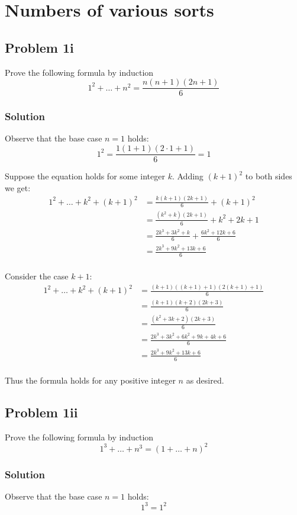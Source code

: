 \section{Numbers of various sorts}
\subsection*{Problem 1i}
Prove the following formula by induction
\[1^2+\ldots+n^2=\frac{n(n+1)(2n+1)}{6}\]

\subsubsection*{Solution}
Observe that the base case $n=1$ holds:
\[1^2=\frac{1(1+1)(2\cdot1+1)}{6}=1\]

Suppose the equation holds for some integer $k$. Adding $(k+1)^2$ to both sides we get:
\begin{align*}
    1^2+\ldots+k^2+(k+1)^2&=\frac{k(k+1)(2k+1)}{6}+(k+1)^2\\
    &=\frac{(k^2+k)(2k+1)}{6}+k^2+2k+1\\
    &=\frac{2k^3+3k^2+k}{6}+\frac{6k^2+12k+6}{6}\\
    &=\frac{2k^3+9k^2+13k+6}{6}\\
\end{align*}

Consider the case $k+1$:
\begin{align*}
    1^2+\ldots+k^2+(k+1)^2&=\frac{(k+1)((k+1)+1)(2(k+1)+1)}{6}\\
    &=\frac{(k+1)(k+2)(2k+3)}{6}\\
    &=\frac{(k^2+3k+2)(2k+3)}{6}\\
    &=\frac{2k^3+3k^2+6k^2+9k+4k+6}{6}\\
    &=\frac{2k^3+9k^2+13k+6}{6}\\
\end{align*}

Thus the formula holds for any positive integer $n$ as desired.

\subsection*{Problem 1ii}
Prove the following formula by induction
\[1^3+\ldots+n^3=(1+\ldots+n)^2\]

\subsubsection*{Solution}
Observe that the base case $n=1$ holds:
\[1^3=1^2\]

